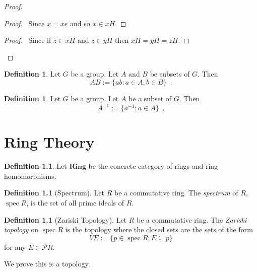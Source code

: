 \documentclass{book}
\let\qed\relax
\theoremstyle{definition}
\newtheorem{df}[ax]{Definition}
\newcommand{\inv}[1]{\ensuremath{{#1}^{-1}}}
\newcommand{\spec}{\ensuremath{\operatorname{spec}}}
\begin{document}
\begin{proof}
\pf
{}
\begin{proof}
	\pf\ Since $x = xe$ and so $x \in xH$.
\end{proof}
\begin{proof}
	\pf\ Since if $z \in xH$ and $z \in yH$ then $xH = yH = zH$.
\end{proof}
\qed
\end{proof}

\begin{df}
Let $G$ be a group. Let $A$ and $B$ be subsets of $G$. Then
\[ AB := \{ ab : a \in A, b \in B \} \enspace . \]
\end{df}

\begin{df}
Let $G$ be a group. Let $A$ be a subset of $G$. Then
\[ \inv{A} := \{ \inv{a} : a \in A \} \enspace . \]
\end{df}

\chapter{Ring Theory}

\begin{df}
Let $\mathbf{Ring}$ be the concrete category of rings and ring homomorphisms.
\end{df}

\begin{df}[Spectrum]
Let $R$ be a commutative ring. The \emph{spectrum} of $R$, $\spec R$, is the set of all prime ideals of $R$.
\end{df}

\begin{df}[Zariski Topology]
Let $R$ be a commutative ring. The \emph{Zariski topology} on $\spec R$ is the topology where the closed sets are the sets of the form
\[ VE := \{ p \in \spec R : E \subseteq p \} \]
for any $E \in \mathcal{P} R$.

We prove this is a topology.
\end{df}
\end{document}
